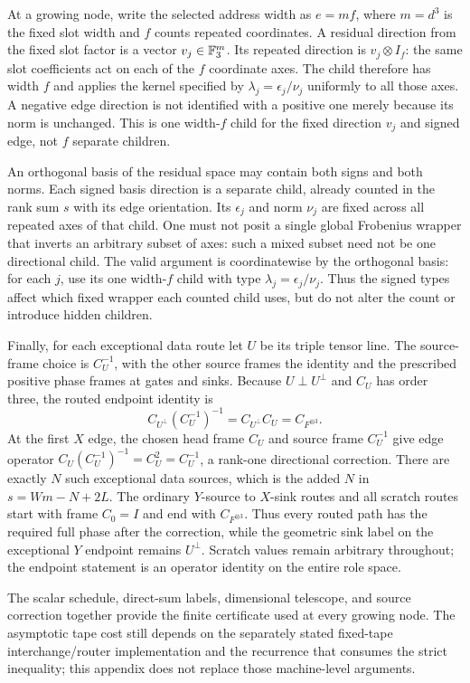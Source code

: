 At a growing node, write the selected address width as $e=mf$, where $m=d^3$ is the fixed slot width and $f$ counts repeated coordinates. A residual direction from the fixed slot factor is a vector $v_j\in\mathbb F_3^m$. Its repeated direction is $v_j\otimes I_f$: the same slot coefficients act on each of the $f$ coordinate axes. The child therefore has width $f$ and applies the kernel specified by $\lambda_j=\epsilon_j/\nu_j$ uniformly to all those axes. A negative edge direction is not identified with a positive one merely because its norm is unchanged. This is one width-$f$ child for the fixed direction $v_j$ and signed edge, not $f$ separate children.

An orthogonal basis of the residual space may contain both signs and both norms. Each signed basis direction is a separate child, already counted in the rank sum $s$ with its edge orientation. Its $\epsilon_j$ and norm $\nu_j$ are fixed across all repeated axes of that child. One must not posit a single global Frobenius wrapper that inverts an arbitrary subset of axes: such a mixed subset need not be one directional child. The valid argument is coordinatewise by the orthogonal basis: for each $j$, use its one width-$f$ child with type $\lambda_j=\epsilon_j/\nu_j$. Thus the signed types affect which fixed wrapper each counted child uses, but do not alter the count or introduce hidden children.

Finally, for each exceptional data route let $U$ be its triple tensor line. The source-frame choice is $C_U^{-1}$, with the other source frames the identity and the prescribed positive phase frames at gates and sinks. Because $U\perp U^\perp$ and $C_U$ has order three, the routed endpoint identity is
\[
 C_{U^\perp}(C_U^{-1})^{-1}=C_{U^\perp}C_U=C_{F^{\otimes3}}.
\]
At the first $X$ edge, the chosen head frame $C_U$ and source frame $C_U^{-1}$ give edge operator $C_U(C_U^{-1})^{-1}=C_U^2=C_U^{-1}$, a rank-one directional correction. There are exactly $N$ such exceptional data sources, which is the added $N$ in $s=Wm-N+2L$. The ordinary $Y$-source to $X$-sink routes and all scratch routes start with frame $C_0=I$ and end with $C_{F^{\otimes3}}$. Thus every routed path has the required full phase after the correction, while the geometric sink label on the exceptional $Y$ endpoint remains $U^\perp$. Scratch values remain arbitrary throughout; the endpoint statement is an operator identity on the entire role space.

The scalar schedule, direct-sum labels, dimensional telescope, and source correction together provide the finite certificate used at every growing node. The asymptotic tape cost still depends on the separately stated fixed-tape interchange/router implementation and the recurrence that consumes the strict inequality; this appendix does not replace those machine-level arguments.
